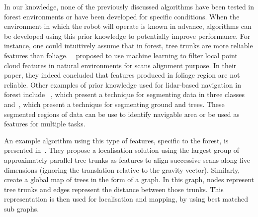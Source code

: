 
In our knowledge, none of the previously discussed algorithms have been tested in forest environments or have been developed for specific conditions. When the environment in which the robot will operate is known in advance, algorithms can be developed using this prior knowledge to potentially improve performance. For instance, one could intuitively assume that in forest, tree trunks are more reliable features than foliage. ~\citet{Latulippe2013} proposed to use machine learning to filter local point cloud features in natural environments for scans alignment purpose. In their paper, they indeed concluded that features produced in foliage region are not reliable. Other examples of prior knowledge used for \gls*{lidar}-based navigation in forest include ~\citep{Lalonde2006}, which present a technique for segmenting data in three classes and~\cite{Mcdaniel2012}, which present a technique for segmenting ground and trees. These segmented regions of data can be use to identify navigable area or be used as features for multiple tasks.

An example algorithm using this type of features, specific to the forest, is presented in~\citet{Song2012}. They propose a localisation solution using the largest group of approximately parallel tree trunks as features to align successive scans along five dimensions (ignoring the translation relative to the gravity vector). Similarly, \citet{Miettinen2007} create a global map of trees in the form of a graph. In this graph, nodes represent tree trunks and edges represent the distance between those trunks. This representation is then used for localisation and mapping, by using best matched sub graphs.

